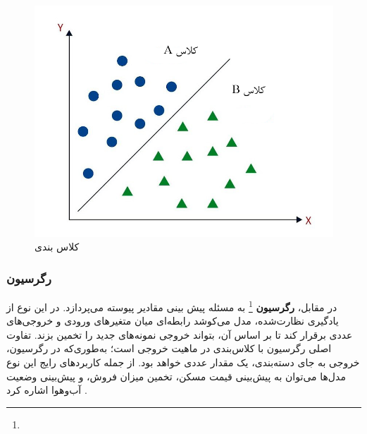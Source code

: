 \begin{figure}[h]
	\centering
	\begin{minipage}[b]{0.7\textwidth}
		\centering
		\includegraphics[width=\textwidth]{transformer_images/persian images/b15.png}
		\caption{کلاس بندی}
		\label{fig:classification}
	\end{minipage}
	\hfill
\end{figure}



\subsubsection{رگرسیون}

در مقابل، \textbf{رگرسیون} \footnote{}  به مسئله پیش‌ بینی مقادیر پیوسته می‌پردازد. در این نوع از یادگیری نظارت‌شده، مدل می‌کوشد رابطه‌ای میان متغیرهای ورودی و خروجی‌های عددی برقرار کند تا بر اساس آن، بتواند خروجی نمونه‌های جدید را تخمین بزند. تفاوت اصلی رگرسیون با کلاس‌بندی در ماهیت خروجی است؛ به‌طوری‌که در رگرسیون، خروجی به جای دسته‌بندی، یک مقدار عددی خواهد بود. از جمله کاربردهای رایج این نوع مدل‌ها می‌توان به پیش‌بینی قیمت مسکن، تخمین میزان فروش، و پیش‌بینی وضعیت آب‌وهوا اشاره کرد \cite{montgomery2021introduction}.


